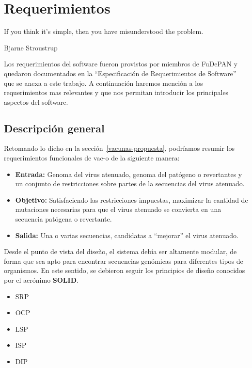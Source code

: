 \chapter{Requerimientos}
\epigraph{If you think it's simple, then you have misunderstood the problem.}%
{Bjarne Stroustrup}

Los requerimientos del software fueron provistos por miembros de \ac{FuDePAN} y
quedaron documentados en la ``Especificaci\'on de Requerimientos de Software''
que se anexa a este trabajo. A continuaci\'on haremos menci\'on a los
requerimientos mas relevantes y que nos permitan introducir los principales
aspectos del software.

\section{Descripci\'on general}

Retomando lo dicho en la secci\'on~\ref{vacunas-propuesta}, podr\'iamos
resumir los requerimientos funcionales de \ac{vac-o} de la siguiente manera:

\begin{itemize}
 \item \textbf{Entrada:} Genoma del virus atenuado, genoma del pat\'ogeno o
revertantes y un conjunto de restricciones sobre partes de la secuencias del
virus atenuado.
 \item \textbf{Objetivo:} Satisfaciendo las restricciones impuestas, maximizar
la cantidad de mutaciones necesarias para que el virus atenuado se convierta en
una secuencia pat\'ogena o revertante.
 \item \textbf{Salida:} Una o varias secuencias, candidatas a ``mejorar'' el
virus atenuado.
\end{itemize}

Desde el punto de vista del dise\~no, el sistema deb\'ia ser altamente modular,
de forma que sea apto para encontrar secuencias gen\'omicas para diferentes
tipos de organismos. En este sentido, se debieron seguir los principios de
dise\~no conocidos por el acr\'onimo \textbf{SOLID}\cite{Martin00}.

\begin{itemize}
  \item \ac{SRP}
  \item \ac{OCP}
  \item \ac{LSP}
  \item \ac{ISP}
  \item \ac{DIP}
\end{itemize}

